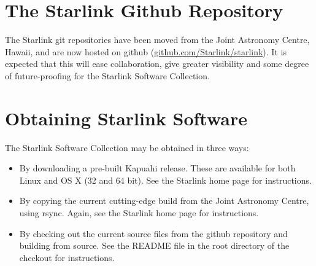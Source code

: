 \documentclass[11pt,twoside]{article}
\begin{document}
\section{The Starlink Github Repository}
The Starlink git repositories have been moved from the Joint Astronomy
Centre, Hawaii, and are now hosted on github
(\url{github.com/Starlink/starlink}). It is expected that this
will ease collaboration, give greater visibility and some degree of
future-proofing for the Starlink Software Collection.

\section{Obtaining Starlink Software}
The Starlink Software Collection may be obtained in three ways:
\begin{itemize}
\item By downloading a pre-built Kapuahi release. These are available for both Linux and OS X (32 and 64 bit). See the Starlink home page for instructions.
\item By copying the current cutting-edge build from the Joint Astronomy Centre, using rsync. Again, see the Starlink home page for instructions.
\item By checking out the current source files from the github repository and building from source. See the README file in the root directory of the checkout for instructions.
\end{itemize}



\end{document}
